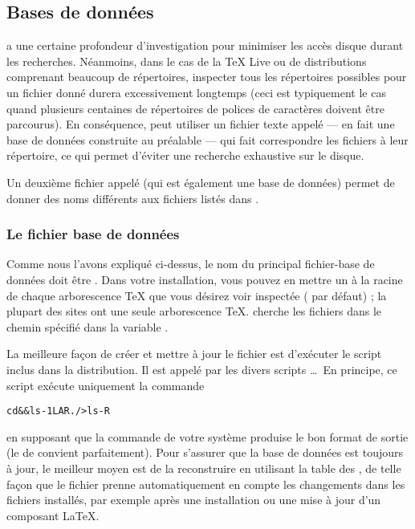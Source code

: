 \documentclass[german, english, french]{article}
\renewcommand{\TL}{\TeX{} Live\xspace}%
\begin{document}
\subsection{Bases de données}
\label{sec:filename-database}

\KPS{} a une certaine profondeur d'investigation pour minimiser les accès disque
durant les recherches. Néanmoins, dans le cas de la \TL{} ou de distributions
comprenant beaucoup de répertoires, inspecter tous les répertoires possibles
pour un fichier donné durera excessivement longtemps (ceci est typiquement le
cas quand plusieurs centaines de répertoires de polices de caractères doivent
être parcourus). En conséquence, \KPS{} peut utiliser un fichier texte appelé
 --- en fait une base de données construite au préalable --- qui fait
correspondre les fichiers à leur répertoire, ce qui permet d'éviter une
recherche exhaustive sur le disque.

Un deuxième fichier appelé  (qui est également une base de
données) permet de donner des noms différents aux fichiers listés dans
\mbox{}.

\subsubsection{Le fichier base de données}
\label{sec:ls-R}

Comme nous l'avons expliqué ci-dessus, le nom du principal fichier-base de
données doit être \mbox{}.  Dans votre installation, vous pouvez en
mettre un à la racine de chaque arborescence \TeX{} que vous désirez voir
inspectée ( par défaut) ; la plupart des sites ont une seule
arborescence \TeX{}.  \KPS{} cherche les fichiers  dans le chemin
spécifié dans la variable .

La meilleure façon de créer et mettre à jour le fichier  est
d'exécuter le script  inclus dans la distribution. Il est
appelé par les divers scripts \dots\ En principe, ce script
exécute uniquement la commande
\begin{alltt}
cd  && \boi{}ls -1LAR ./ >ls-R
\end{alltt}
en supposant que la commande  de votre système produise le bon format
de sortie (le  de \GNU convient parfaitement). Pour s'assurer que la
base de données est toujours à jour, le meilleur moyen est de la reconstruire en
utilisant la table des , de telle façon que le fichier 
prenne automatiquement en compte les changements dans les fichiers installés,
par exemple après une installation ou une mise à jour d'un composant \LaTeX{}.
\end{document}
